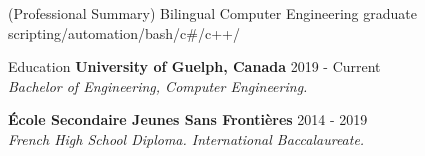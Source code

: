\documentclass{resume}
\begin{document}
    \begin{rSection}{}
        \begin{center}
            (Professional Summary) Bilingual Computer Engineering graduate scripting/automation/bash/c#/c++/
        \end{center}

    \end{rSection}

    \begin{rSection}{Education}
        \textbf{University of Guelph, Canada}
        \hfill{2019 - Current} \\ 
        {\em Bachelor of Engineering, Computer Engineering.}
        \hfill{}

        \textbf{École Secondaire Jeunes Sans Frontières}
        \hfill {2014 - 2019} \\ 
        {\em French High School Diploma. International Baccalaureate.}
        \hfill {}
    \end{rSection}
\end{document}
